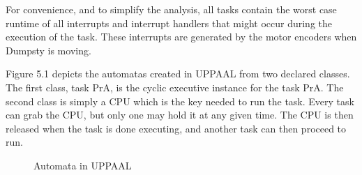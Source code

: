 For convenience, and to simplify the analysis, all tasks contain the worst case runtime of all interrupts and interrupt handlers that might occur during the execution of the task. These interrupts are generated by the motor encoders when Dumpsty is moving.

Figure 5.1 depicts the automatas created in UPPAAL from two declared classes. The first class, task PrA, is the cyclic executive instance for the task PrA. The second class is simply a CPU which is the key needed to run the task. Every task can grab the CPU, but only one may hold it at any given time. The CPU is then released when the task is done executing, and another task can then proceed to run.

\begin{figure}[h]
	\centering
	\caption{Automata in UPPAAL}
	\label{robot}
\end{figure}

